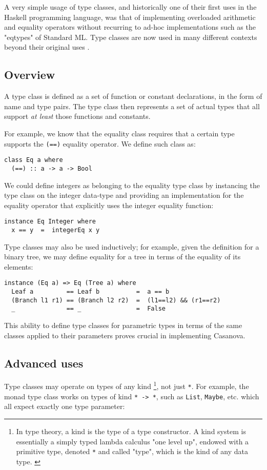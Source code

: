 A very simple usage of type classes, and historically one of their first uses in the Haskell programming language, was that of implementing overloaded arithmetic and equality operators without recurring to ad-hoc implementations such as the "eqtypes" of Standard ML. Type classes are now used in many different contexts beyond their original uses \cite{APPENDIX_E_USES_OF_TYPE_CLASSES}.

\subsection{Overview}
A type class is defined as a set of function or constant declarations, in the form of name and type pairs. The type class then represents a set of actual types that all support \textit{at least} those functions and constants.

For example, we know that the equality class requires that a certain type supports the \texttt{(==)} equality operator. We define such class as:

\begin{lstlisting}
class Eq a where
  (==) :: a -> a -> Bool
\end{lstlisting}

We could define integers as belonging to the equality type class by instancing the type class on the integer data-type and providing an implementation for the equality operator that explicitly uses the integer equality function:

\begin{lstlisting}
instance Eq Integer where 
  x == y  =  integerEq x y
\end{lstlisting}

Type classes may also be used inductively; for example, given the definition for a binary tree, we may define equality for a tree in terms of the equality of its elements:

\begin{lstlisting}
instance (Eq a) => Eq (Tree a) where 
  Leaf a         == Leaf b          =  a == b
  (Branch l1 r1) == (Branch l2 r2)  =  (l1==l2) && (r1==r2)
  _              == _               =  False
\end{lstlisting}

This ability to define type classes for parametric types in terms of the same classes applied to their parameters proves crucial in implementing Casanova.


\subsection{Advanced uses}
Type classes may operate on types of any kind \footnote{In type theory, a kind is the type of a type constructor. A kind system is essentially a simply typed lambda calculus "one level up", endowed with a primitive type, denoted \texttt{*} and called "type", which is the kind of any data type. \cite{CHAPTER_1_PL_INFLUENCE_ON_PL}}, not just \texttt{*}. For example, the monad type class works on types of kind \texttt{* -> *}, such as \texttt{List}, \texttt{Maybe}, etc. which all expect exactly one type parameter:

